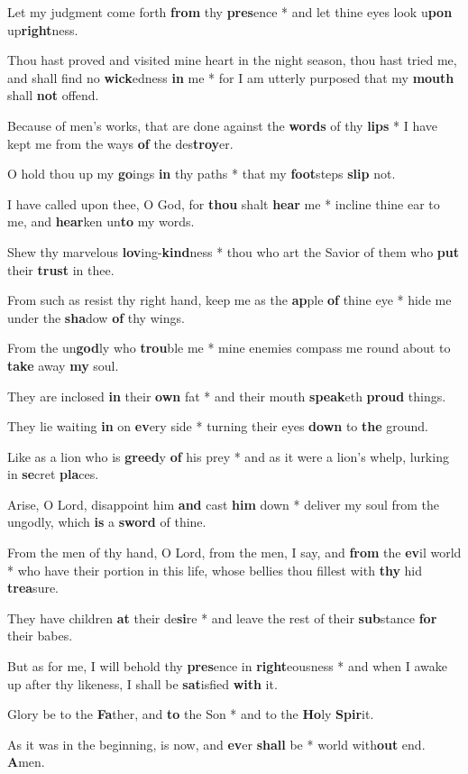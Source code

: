 \begin{multicols}{2}
	Let my judgment come forth \textbf{from} thy \textbf{pres}ence * and let thine eyes look u\textbf{pon} up\textbf{right}ness.
	
	Thou hast proved and visited mine heart in the night season, thou hast tried me, and shall find no \textbf{wick}edness \textbf{in} me * for I am utterly purposed that my \textbf{mouth} shall \textbf{not} offend.
	
	Because of men's works, that are done against the \textbf{words} of thy \textbf{lips} * I have kept me from the ways \textbf{of} the des\textbf{troy}er.
	
	O hold thou up my \textbf{go}ings \textbf{in} thy paths * that my \textbf{foot}steps \textbf{slip} not.
	
	I have called upon thee, O God, for \textbf{thou} shalt \textbf{hear} me * incline thine ear to me, and \textbf{hear}ken un\textbf{to} my words.
	
	Shew thy marvelous \textbf{lov}ing-\textbf{kind}ness * thou who art the Savior of them who \textbf{put} their \textbf{trust} in thee.
	
	From such as resist thy right hand, keep me as the \textbf{ap}ple \textbf{of} thine eye * hide me under the \textbf{sha}dow \textbf{of} thy wings.
	
	From the un\textbf{god}ly who \textbf{trou}ble me * mine enemies compass me round about to \textbf{take} away \textbf{my} soul.
	
	They are inclosed \textbf{in} their \textbf{own} fat * and their mouth \textbf{speak}eth \textbf{proud} things.
	
	They lie waiting \textbf{in} on \textbf{ev}ery side * turning their eyes \textbf{down} to \textbf{the} ground.
	
	Like as a lion who is \textbf{greed}y \textbf{of} his prey * and as it were a lion's whelp, lurking in \textbf{se}cret \textbf{pla}ces.
	
	Arise, O Lord, disappoint him \textbf{and} cast \textbf{him} down * deliver my soul from the ungodly, which \textbf{is} a \textbf{sword} of thine.
	
	From the men of thy hand, O Lord, from the men, I say, and \textbf{from} the \textbf{ev}il world * who have their portion in this life, whose bellies thou fillest with \textbf{thy} hid \textbf{trea}sure.
	
	They have children \textbf{at} their de\textbf{si}re * and leave the rest of their \textbf{sub}stance \textbf{for} their babes.
	
	But as for me, I will behold thy \textbf{pres}ence in \textbf{right}eousness * and when I awake up after thy likeness, I shall be \textbf{sat}isfied \textbf{with} it.
	
	Glory be to the \textbf{Fa}ther, and \textbf{to} the Son * and to the \textbf{Ho}ly \textbf{Spir}it.
	
	As it was in the beginning, is now, and \textbf{ev}er \textbf{shall} be * world with\textbf{out} end. \textbf{A}men.
\end{multicols}